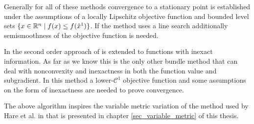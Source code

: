 Generally for all of these methods convergence to a stationary point is established under the assumptions of a locally Lipschitz objective function and bounded level sets \(\{x \in \mathbb{R}^n \mid  f(x) \leq f(\hat{x}^1)\}\).
If the method uses a line search additionally semismoothness of the objective function is needed.

In \cite{Noll2013} the second order approach of \cite{Noll2012} is extended to functions with inexact information.
As far as we know this is the only other bundle method that can deal with nonconvexity and inexactness in both the function value and subgradient. In this method a lower-\(\mathcal{C}^1\) objective function and some assumptions on the form of inexactness are needed to prove convergence.

The above algorithm inspires the variable metric variation of the method used by Hare et al. in \cite{Hare2016} that is presented in chapter \ref{sec_variable_metric} of this thesis.


